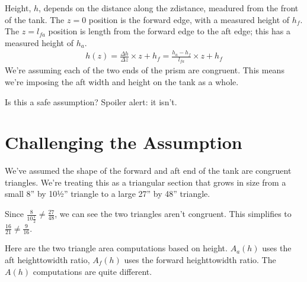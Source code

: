 \documentclass[letterpaper,10pt,english]{sphinxmanual}
\begin{document}
\sphinxAtStartPar
Height, \(h\), depends on the distance along the z\sphinxhyphen{}distance, meadured from the front of the tank.
The \(z=0\) position is the forward edge, with a measured height of \(h_f\).
The \(z=l_{fa}\) position is length from the forward edge to the aft edge; this has a measured height of \(h_a\).
\begin{equation*}
\begin{split}
h(z) = \frac{\Delta h}{\Delta z} \times z + h_f  = \frac{h_a-h_f}{l_{fa}} \times z + h_f
\end{split}
\end{equation*}
\sphinxAtStartPar
We’re assuming each of the two ends of the prism are congruent. This means we’re imposing the aft width and height on the tank as a whole.

\sphinxAtStartPar
Is this a safe assumption? Spoiler alert: it isn’t.


\section{Challenging the Assumption}
\label{\detokenize{prism-irregular:challenging-the-assumption}}
\sphinxAtStartPar
We’ve assumed the shape of the forward and aft end of the tank are congruent triangles.
We’re treating this as a triangular section that grows in size from a small 8” by 10½” triangle
to a large 27” by 48” triangle.

\sphinxAtStartPar
Since \(\frac{8}{10 \tfrac{1}{2}} \neq \frac{27}{48}\), we can see the two triangles aren’t congruent. This simplifies to \(\frac{16}{21} \neq \frac{9}{16}\).

\sphinxAtStartPar
Here are the two triangle area computations based on height. \(A_a(h)\) uses the aft height\sphinxhyphen{}to\sphinxhyphen{}width ratio,
\(A_f(h)\) uses the forward height\sphinxhyphen{}to\sphinxhyphen{}width ratio. The \(A(h)\) computations are quite different.

\begin{sphinxVerbatim}[commandchars=\\\{\}]
    
    

       
       
\end{sphinxVerbatim}
\end{document}
